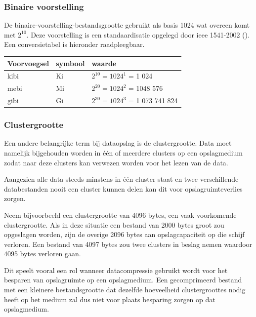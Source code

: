 \subsubsection{Binaire voorstelling}
\label{sec:bestandsgrootte-dataopslag-voorvoegsels-binair}

De \gls{binaire-voorstelling-bestandsgrootte} gebruikt als basis 1024 wat overeen komt met $ 2^{10} $. Deze voorstelling is een standaardisatie opgelegd door \gls{ieee} 1541-2002 (\cite{ieee15412002}). Een conversietabel is hieronder raadpleegbaar.

\FloatBarrier
\begin{table}[h]
	\begin{tabular}{|l|l|l|}
		\hline
		\textbf{Voorvoegsel} & \textbf{symbool} & \textbf{waarde} \\ \hline
		kibi & Ki & $ 2^{10} = 1024^{1} $  = 1 024 \\ \hline
		mebi & Mi & $ 2^{20} = 1024^{2} $ = 1048 576 \\ \hline
		gibi & Gi & $ 2^{30} = 1024^{3} $ = 1 073 741 824 \\ \hline
	\end{tabular}
\end{table}
\FloatBarrier

\subsubsection{Clustergrootte}
\label{sec:bestandsgrootte-dataopslag-clustergrootte}

Een andere belangrijke term bij dataopslag is de \gls{clustergrootte}. Data moet namelijk bijgehouden worden in één of meerdere \glspl{cluster} op een opslagmedium zodat naar deze \glspl{cluster} kan verwezen worden voor het lezen van de data. 

Aangezien alle data steeds minstens in één \gls{cluster} staat en twee verschillende databestanden nooit een \gls{cluster} kunnen delen kan dit voor opslagruimteverlies zorgen. 

Neem bijvoorbeeld een \gls{clustergrootte} van 4096 \glspl{byte}, een vaak voorkomende \gls{clustergrootte}. Als in deze situatie een bestand van 2000 \glspl{byte} groot zou opgeslagen worden, zijn de overige 2096 \glspl{byte} aan opslagcapaciteit op die schijf verloren. Een bestand van 4097 \glspl{byte} zou twee \glspl{cluster} in beslag nemen waardoor 4095 \glspl{byte} verloren gaan. 

Dit speelt vooral een rol wanneer \gls{datacompressie} gebruikt wordt voor het besparen van opslagruimte op een opslagmedium. Een gecomprimeerd bestand met een kleinere bestandsgrootte dat dezelfde hoeveelheid \glspl{clustergrootte} nodig heeft op het medium zal dus niet voor plaats besparing zorgen op dat opslagmedium. 

